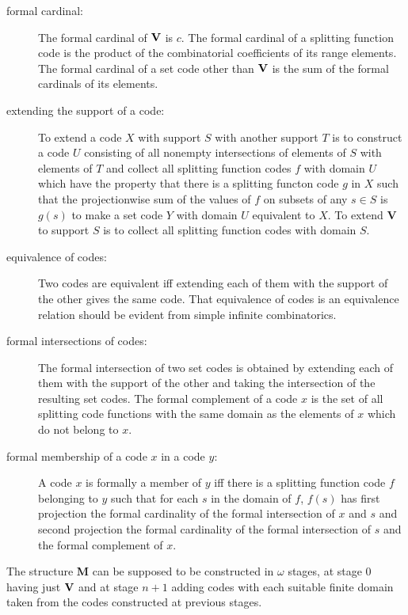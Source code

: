 \documentclass{article}
\begin{document}
\begin{description}
\begin{description}
\item[formal cardinal:]  The formal cardinal of ${\bf V}$ is $c$.  The formal cardinal of a splitting function code is the product of the combinatorial coefficients of its range elements.  The formal cardinal of a set code other than ${\bf V}$ is the sum of the formal cardinals of its elements.

\item[extending the support of a code:]  To extend a code $X$ with support $S$ with another support $T$ is to construct a code $U$ consisting of all nonempty intersections of elements of $S$ with elements of $T$ and collect all splitting function codes $f$ with domain $U$ which have the property that there is a splitting functon code $g$ in $X$ such that the projectionwise sum of the values of $f$ on subsets
of any $s \in S$ is $g(s)$ to make a set code $Y$ with domain $U$ equivalent to $X$.  To extend {\bf V} to support $S$ is to collect all splitting function codes with domain $S$.

\item[equivalence of codes:]  Two codes are equivalent iff extending each of them with the support of the other gives the same code.  That equivalence of codes is an equivalence relation should be evident from simple infinite combinatorics.

\item[formal intersections of codes:]  The formal intersection of two set  codes is obtained by extending each of them with the support of the other and taking the intersection of the resulting set codes.  The formal complement of a code $x$ is the set of all splitting code functions with the same domain as the elements of $x$ which do not belong to $x$.

\item[formal membership of a code $x$ in a code $y$:]  A code $x$ is formally a member of $y$ iff there is a splitting function code $f$ belonging to $y$ such that for each $s$ in the domain of $f$,
$f(s)$ has first projection the formal cardinality of the formal intersection of $x$ and $s$ and second projection the formal cardinality of the formal intersection of $s$ and the formal complement of $x$.

\end{description} 

The structure {\bf M} can be supposed to be constructed in $\omega$ stages, at stage 0 having just ${\bf V}$ and at stage $n+1$ adding codes with each suitable finite domain taken
from the codes constructed at previous stages.


\end{description}
\end{document}
